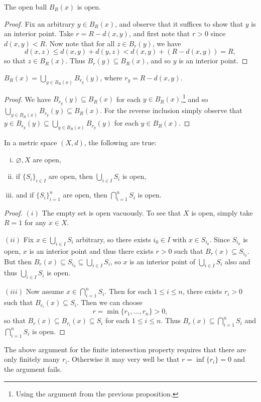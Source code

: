 \begin{prop}
  The open ball $B_R(x)$ is open.
\end{prop}

\begin{proof}
  Fix an arbitrary $y \in B_R(x)$, and observe that
  it suffices to show that $y$ is an interior point.
  Take $r = R - d(x, y)$, and
  first note that $r > 0$ since
  $d(x, y) < R$. Now note that for all $z \in B_r(y)$,
  we have
  \[
    d(x, z) \le d(x, y) + d(y, z)
    < d(x, y) + (R - d(x, y))
    = R,
  \]
  so that $z \in B_R(x)$.
  Thus $B_r(y) \subseteq B_R(x)$, and so $y$ is an interior point.
\end{proof}

\begin{corollary}
  $B_R(x) = \bigcup_{y \in B_R(x)} B_{r_y}(y)$,
  where $r_y = R - d(x, y)$.
\end{corollary}

\begin{proof}
  We have $B_{r_y}(y) \subseteq B_R(x)$
  for each $y \in B_R(x)$,\footnote{Using the argument from the previous proposition.}
  and so
  $\bigcup_{y \in B_R(x)} B_{r_y}(y) \subseteq B_R(x)$.
  For the reverse inclusion simply observe that
  $y \in B_{r_y}(y) \subseteq \bigcup_{y \in B_R(x)} B_{r_y}(y)$ for
  each $y \in B_R(x)$.
\end{proof}

\begin{prop}
  In a metric space $(X, d)$, the following
  are true:
  \begin{enumerate}[(i)]
    \item $\varnothing, X$ are open,
    \item if $\{S_i\}_{i \in I}$ are open, then
      $\bigcup_{i \in I} S_i$ is open,
    \item and if $\{S_i\}_{i = 1}^n$ are open, then
      $\bigcap_{i = 1}^n S_i$ is open.
  \end{enumerate}
\end{prop}

\begin{proof}
  $(i)$ The empty set is open vacuously.
  To see that $X$ is open, simply take $R = 1$
  for any $x \in X$.

  $(ii)$ Fix $x \in \bigcup_{i \in I} S_i$
  arbitrary, so there exists $i_0 \in I$ with
  $x \in S_{i_0}$. Since $S_{i_0}$ is open,
  $x$ is an interior point and thus there exists
  $r > 0$ such that $B_r(x) \subseteq S_{i_0}$.
  But then $B_r(x) \subseteq S_{i_0} \subseteq \bigcup_{i \in I} S_i$,
  so $x$ is an interior point of
  $\bigcup_{i \in I} S_i$ also and thus
  $\bigcup_{i \in I} S_i$ is open.

  $(iii)$ Now assume $x \in \bigcap_{i = 1}^n S_i$.
  Then for each $1 \le i \le n$, there exists
  $r_i > 0$ such that $B_{r_i}(x) \subseteq S_i$.
  Then we can choose
  \[
    r = \min\{r_1, \ldots, r_n\} > 0,
  \]
  so that $B_r(x) \subseteq B_{r_i}(x) \subseteq S_i$
  for each $1 \le i \le n$. Thus
  $B_r(x) \subseteq \bigcap_{i = 1}^n S_i$
  and $\bigcap_{i = 1}^n S_i$ is open.
\end{proof}

\begin{remark}
  The above argument for the finite intersection
  property requires that there are only finitely
  many $r_i$. Otherwise it may very well be that
  $r = \inf\{r_i\} = 0$ and the argument fails.
\end{remark}
